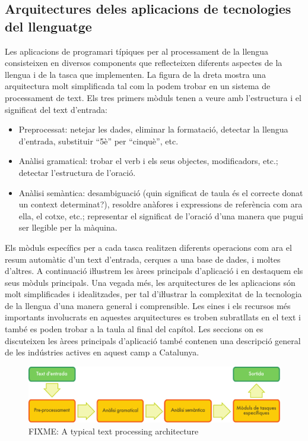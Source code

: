 \documentclass[]{../../metanetpaper}
\begin{document}
\begin{multicols}{2}
\subsection[Arquitectures de les aplicacions de tecnologies del llenguatge]{Arquitectures de\newline les aplicacions de tecnologies del llenguatge}

Les aplicacions de programari típiques per al processament de la llengua consisteixen en diversos components que reflecteixen diferents aspectes de la llengua i de la tasca que implementen. La figura de la dreta mostra una arquitectura molt simplificada tal com la podem trobar en un sistema de processament de text. Els tres primers mòduls tenen a veure amb l’estructura i el significat del text d’entrada:
\begin{itemize}
\item Preprocessat: netejar les dades, eliminar la formatació, detectar la llengua d’entrada, substituir “5è” per “cinquè”, etc.
\item Anàlisi gramatical: trobar el verb i els seus objectes, modificadors, etc.; detectar l’estructura de l’oració.
\item Anàlisi semàntica: desambiguació (quin significat de taula és el correcte donat un context determinat?), resoldre anàfores i expressions de referència com ara ella, el cotxe, etc.; representar el significat de l’oració d’una manera que pugui ser llegible per la màquina.
\end{itemize}


Els mòduls específics per a cada tasca realitzen diferents operacions com ara el resum automàtic d’un text d’entrada, cerques a una base de dades, i moltes d’altres. A continuació iŀlustrem les àrees principals d’aplicació i en destaquem els seus mòduls principals. Una vegada més, les arquitectures de les aplicacions són molt simplificades i idealitzades, per tal d’iŀlustrar la complexitat de la tecnologia de la llengua d’una manera general i comprensible. Les eines i els recursos més importants involucrats en aquestes arquitectures es troben subratllats en el text i també es poden trobar a la taula al final del capítol. Les seccions on es discuteixen les àrees principals d’aplicació també contenen una descripció general de les indústries actives en aquest camp a Catalunya.

\begin{figure}[b]
  \center
  \vspace{-5mm} \includegraphics[width=\textwidth]{../_media/catalan/text_processing_app_architecture}
  \caption{FIXME: A typical text processing architecture}
  \label{fig:textprocessingarch_ca}
\end{figure}


\end{multicols}
\end{document}
